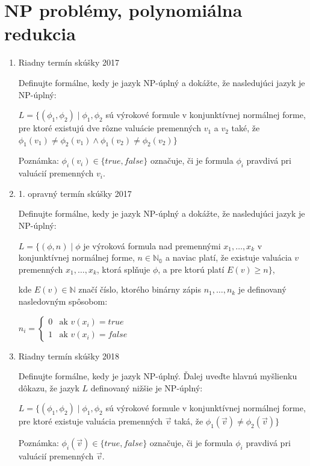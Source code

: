 \documentclass[]{article}
\begin{document}
	\section{NP problémy, polynomiálna redukcia}

	\begin{enumerate}
		\item Riadny termín skúšky 2017
		
		Definujte formálne, kedy je jazyk NP-úplný a dokážte, že nasledujúci jazyk je NP-úplný:
		
		$L = \{(\phi_1, \phi_2) \mid \phi_1, \phi_2$ sú výrokové formule v konjunktívnej normálnej forme, pre ktoré existujú dve rôzne valuácie premenných $v_1$ a $v_2$ také, že $\phi_1(v_1) \neq \phi_2(v_1) \land \phi_1(v_2) \neq \phi_2(v_2)\}$
		
		Poznámka: $\phi_i(v_i) \in \{true, false\}$ označuje, či je formula $\phi_i$ pravdivá pri valuácií premenných $v_i$.
		
		\item 1. opravný termín skúšky 2017
		
		Definujte formálne, kedy je jazyk NP-úplný a dokážte, že nasledujúci jazyk je NP-úplný:
		
		$L = \{(\phi, n) \mid \phi$ je výroková formula nad premennými $x_1, \ldots, x_k$ v konjunktívnej normálnej forme, $n \in \mathbb{N_0}$ a naviac platí, že existuje valuácia $v$ premenných $x_1, \ldots, x_k$, ktorá splňuje $\phi$, a pre ktorú platí $E(v) \geq n\}$,
		
		kde $E(v) \in \mathbb{N}$ značí číslo, ktorého binárny zápis $n_1, \ldots, n_k$ je definovaný nasledovným spôsobom:
		
		$n_i =
		\left\{
		\begin{array}{ll}
			0  & \mbox{ak } v(x_i) = true \\
			1 & \mbox{ak } v(x_i) = false
		\end{array}
		\right.$
		
		\item Riadny termín skúšky 2018
		
		Definujte formálne, kedy je jazyk NP-úplný. Ďalej uveďte hlavnú myšlienku dôkazu, že jazyk $L$ definovaný nižšie je NP-úplný:
		
		$L = \{(\phi_1, \phi_2) \mid \phi_1, \phi_2$ sú výrokové formule v konjunktívnej normálnej forme, pre ktoré existuje valuácia premenných $\vec{v}$ taká, že $\phi_1(\vec{v}) \neq \phi_2(\vec{v})\}$
		
		Poznámka: $\phi_i(\vec{v}) \in \{true, false\}$ označuje, či je formula $\phi_i$ pravdivá pri valuácií premenných $\vec{v}$.
	\end{enumerate}
\end{document}
